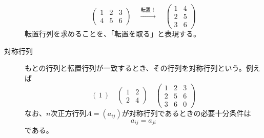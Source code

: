 \documentclass[10pt]{jsarticle}
\newcommand{\kakko}[1]{\left(#1 \right)} %
\numberwithin{equation}{section}%
\begin{document}
\begin{description}
    \begin{equation}
      \left( 
        \begin{matrix}
          1 & 2 & 3 \\
          4 & 5 & 6 
        \end{matrix}
      \right) \quad \overset{転置！}{\to} \quad\left( 
        \begin{matrix}
          1 & 4  \\
          2 & 5   \\
          3 & 6 
        \end{matrix}
      \right)
    \end{equation}
    転置行列を求めることを、「転置を取る」と表現する。
  \item[対称行列] もとの行列と転置行列が一致するとき、その行列を対称行列という。例えば
  \begin{equation}
 \label{taisho}   \kakko{ \, 1 \, }\quad \left( 
      \begin{matrix}
        1 & 2  \\
        2 & 4  
      \end{matrix}
    \right) \quad \left( 
      \begin{matrix}
        1 & 2 & 3 \\
        2 & 5 & 6 \\
        3 & 6 & 0
      \end{matrix}
    \right)
  \end{equation}
  なお、$n$次正方行列$A=(a_{ij})$が対称行列であるときの必要十分条件は
  \begin{equation}
    a_{ij}=a_{ji}
  \end{equation}
  である。
\end{description}
\end{document}
